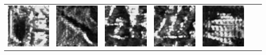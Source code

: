 \documentclass{article}
\begin{document}
\begin{table}[t]
\begin{tabular}{ccccccc}
   			\includegraphics[scale=0.32]{Images/generated_data_80x80_upsampled/168000_00832.jpg}  &
   			\includegraphics[scale=0.32]{Images/generated_data_80x80_upsampled/186000_00700.jpg}  &   			
   			\includegraphics[scale=0.32]{Images/generated_data_80x80_upsampled/186000_00704.jpg}  & 
   			\includegraphics[scale=0.32]{Images/generated_data_80x80_upsampled/186000_00707.jpg}  & 
   			\includegraphics[scale=0.32]{Images/generated_data_80x80_upsampled/186000_00720.jpg}  &

\end{tabular}
\end{table}
\end{document}
